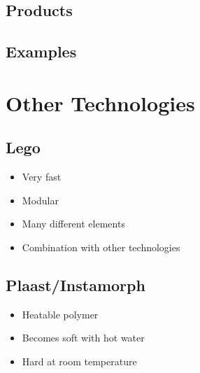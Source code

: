 \documentclass[aspectratio=169]{beamer}
\begin{document}
\subsection{Products}

\begin{frame}
\end{frame}

\begin{frame}
\end{frame}

\subsection{Examples}

\begin{frame}
\end{frame}

\begin{frame}
\end{frame}

\section{Other Technologies}

\subsection{Lego \texttrademark}

\begin{frame}
    \begin{itemize}
        \item Very fast
        \item Modular
        \item Many different elements
        \item Combination with other technologies
    \end{itemize}
\end{frame}

\subsection{Plaast/Instamorph}

\begin{frame}
    \begin{itemize}
        \item Heatable polymer
        \item Becomes soft with hot water
        \item Hard at room temperature
    \end{itemize}
\end{frame}
\end{document}
